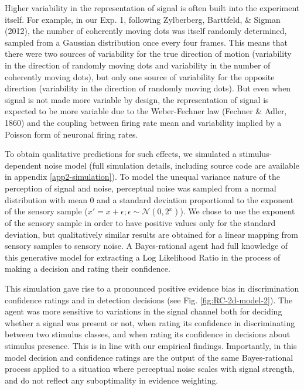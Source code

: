 \documentclass[12pt,twoside]{reedthesis}
\begin{document}
Higher variability in the representation of signal is often built into the experiment itself. For example, in our Exp. 1, following Zylberberg, Barttfeld, \& Sigman (2012), the number of coherently moving dots was itself randomly determined, sampled from a Gaussian distribution once every four frames. This means that there were two sources of variability for the true direction of motion (variability in the direction of randomly moving dots and variability in the number of coherently moving dots), but only one source of variability for the opposite direction (variability in the direction of randomly moving dots). But even when signal is not made more variable by design, the representation of signal is expected to be more variable due to the Weber-Fechner law (Fechner \& Adler, 1860) and the coupling between firing rate mean and variability implied by a Poisson form of neuronal firing rates.

To obtain qualitative predictions for such effects, we simulated a stimulus-dependent noise model (full simulation details, including source code are available in appendix \ref{app2-simulation}). To model the unequal variance nature of the perception of signal and noise, perceptual noise was sampled from a normal distribution with mean 0 and a standard deviation proportional to the exponent of the sensory sample (\(x'=x+\epsilon; \epsilon \sim \mathcal{N}(0,2^x)\)). We chose to use the exponent of the sensory sample in order to have positive values only for the standard deviation, but qualitatively similar results are obtained for a linear mapping from sensory samples to sensory noise. A Bayes-rational agent had full knowledge of this generative model for extracting a Log Likelihood Ratio in the process of making a decision and rating their confidence.

This simulation gave rise to a pronounced positive evidence bias in discrimination confidence ratings and in detection decisions (see Fig. \ref{fig:RC-2d-model-2}). The agent was more sensitive to variations in the signal channel both for deciding whether a signal was present or not, when rating its confidence in discriminating between two stimulus classes, and when rating its confidence in decisions about stimulus presence. This is in line with our empirical findings. Importantly, in this model decision and confidence ratings are the output of the same Bayes-rational process applied to a situation where perceptual noise scales with signal strength, and do not reflect any suboptimality in evidence weighting.
\end{document}
